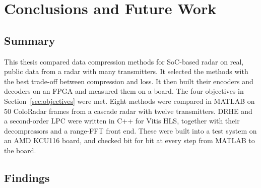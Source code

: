 \chapter{Conclusions and Future Work}
\label{ch:conclusion}

\section{Summary}

This thesis compared data compression methods for SoC-based radar on real,
public data from a radar with many transmitters. It selected the methods with
the best trade-off between compression and loss. It then built their encoders
and decoders on an FPGA and measured them on a board. The four objectives in
Section~\ref{sec:objectives} were met. Eight methods were compared in MATLAB on
50 ColoRadar frames from a cascade radar with twelve transmitters. DRHE and a
second-order LPC were written in C++ for Vitis HLS, together with their
decompressors and a range-FFT front end. These were built into a test system on
an AMD KCU116 board, and checked bit for bit at every step from MATLAB to the
board.

\section{Findings}

